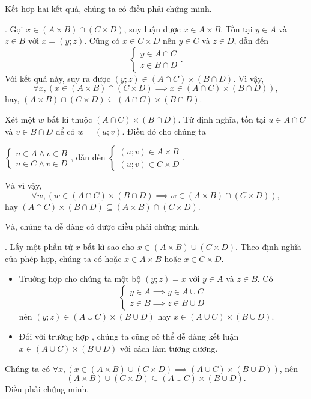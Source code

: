 Kết hợp hai kết quả, chúng ta có điều phải chứng minh.

. Gọi $x \in (A \times B) \cap (C \times D)$, suy luận được $x \in A \times B$. Tồn tại $y \in A$ và $z \in B$ với $x = (y; z)$. Cũng có $x \in C \times D$ nên $y \in C$ và $z \in D$, dẫn đến
\begin{equation*}
   \begin{cases}
      y \in A \cap C \\
      z \in B \cap D
   \end{cases}.
\end{equation*}
Với kết quả này, suy ra được $(y; z) \in (A \cap C) \times (B \cap D)$. Vì vậy, $$\forall x, \left(x \in (A \times B) \cap (C \times D) \implies x \in (A \cap C) \times (B \cap D)\right),$$ hay, $(A \times B) \cap (C \times D) \subseteq (A \cap C) \times (B \cap D)$. 

Xét một $w$ bất kì thuộc $(A \cap C) \times (B \cap D)$. Từ định nghĩa, tồn tại $u \in A \cap C$ và $v \in B \cap D$ để có $w = (u; v)$. Điều đó cho chúng ta
\begin{center}
   $\begin{cases}
      u \in A \land v \in B \\
      u \in C \land v \in D
   \end{cases}$, dẫn đến $\begin{cases}
      (u; v) \in A \times B \\
      (u; v) \in C \times D
   \end{cases}$. 
\end{center}
Và vì vậy, \begin{equation*}
   \forall w, \left(w \in (A \cap C) \times (B \cap D) \implies w \in (A \times B) \cap (C \times D)\right),
\end{equation*}
hay $(A \cap C) \times (B \cap D) \subseteq (A \times B) \cap (C \times D)$.

Và, chúng ta dễ dàng có được điều phải chứng minh.

. Lấy một phần tử $x$ bất kì sao cho $x \in (A \times B) \cup (C \times D)$. Theo định nghĩa của phép hợp, chúng ta có hoặc $x \in A \times B$ hoặc $x \in C \times D$.
\begin{itemize}
   \item Trường hợp  cho chúng ta một bộ $(y; z) = x$ với $y \in A$ và $z \in B$. Có $$\begin{cases}
      y \in A \implies y \in A \cup C \\
      z \in B \implies z \in B \cup D
   \end{cases}$$ nên $(y; z) \in (A \cup C) \times (B \cup D)$ hay $x \in (A \cup C) \times (B \cup D)$.
   \item Đối với trường hợp , chúng ta cũng có thể dễ dàng kết luận $x \in (A \cup C) \times (B \cup D)$ với cách làm tương đương.
\end{itemize}
Chúng ta có $\forall x, \left(x \in (A \times B) \cup (C \times D) \implies (A \cup C) \times (B \cup D)\right)$, nên $$(A \times B) \cup (C \times D) \subseteq (A \cup C) \times (B \cup D).$$
Điều phải chứng minh.

